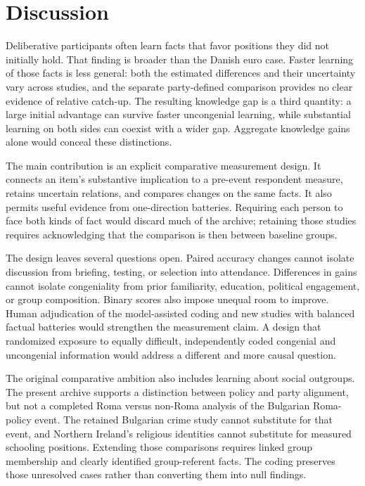 \documentclass[11pt]{article}
\begin{document}
\section{Discussion}

Deliberative participants often learn facts that favor positions they did not initially hold. That finding is broader than the Danish euro case. Faster learning of those facts is less general: both the estimated differences and their uncertainty vary across studies, and the separate party-defined comparison provides no clear evidence of relative catch-up. The resulting knowledge gap is a third quantity: a large initial advantage can survive faster uncongenial learning, while substantial learning on both sides can coexist with a wider gap. Aggregate knowledge gains alone would conceal these distinctions.

The main contribution is an explicit comparative measurement design. It connects an item's substantive implication to a pre-event respondent measure, retains uncertain relations, and compares changes on the same facts. It also permits useful evidence from one-direction batteries. Requiring each person to face both kinds of fact would discard much of the archive; retaining those studies requires acknowledging that the comparison is then between baseline groups.

The design leaves several questions open. Paired accuracy changes cannot isolate discussion from briefing, testing, or selection into attendance. Differences in gains cannot isolate congeniality from prior familiarity, education, political engagement, or group composition. Binary scores also impose unequal room to improve. Human adjudication of the model-assisted coding and new studies with balanced factual batteries would strengthen the measurement claim. A design that randomized exposure to equally difficult, independently coded congenial and uncongenial information would address a different and more causal question.

The original comparative ambition also includes learning about social outgroups. The present archive supports a distinction between policy and party alignment, but not a completed Roma versus non-Roma analysis of the Bulgarian Roma-policy event. The retained Bulgarian crime study cannot substitute for that event, and Northern Ireland's religious identities cannot substitute for measured schooling positions. Extending those comparisons requires linked group membership and clearly identified group-referent facts. The coding preserves those unresolved cases rather than converting them into null findings.

\clearpage


\clearpage
\appendix
{}
\renewcommand{\thetable}{\thesection\arabic{table}}
\renewcommand{\thefigure}{\thesection\arabic{figure}}
\renewcommand{\theequation}{\thesection\arabic{equation}}

\end{document}
